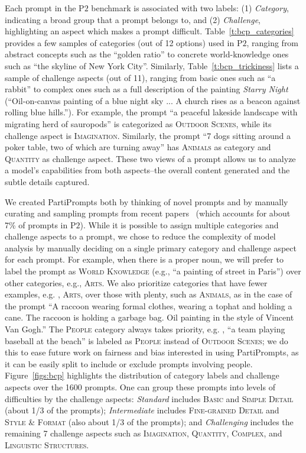 Each prompt in the P$2$ benchmark is associated with two labels: (1) {\it Category}, indicating a broad group that a prompt belongs to, and (2) {\it Challenge}, highlighting an aspect which makes a prompt difficult.
Table~\ref{t:bcp_categories} provides a few samples of categories (out of 12 options) used in P$2$, ranging from abstract concepts such as the ``golden ratio'' to concrete world-knowledge ones such as ``the skyline of New York City''. Similarly, Table~\ref{t:bcp_trickiness} lists a sample of challenge aspects (out of 11), ranging from basic ones such as ``a rabbit'' to complex ones such as a full description of the painting \textit{Starry Night} (``Oil-on-canvas painting of a blue night sky ... A church rises as a beacon against rolling blue hills.''). For example, the prompt ``a peaceful lakeside landscape with migrating herd of sauropods'' is categorized as \textsc{Outdoor Scenes}, while its challenge aspect is \textsc{Imagination}. Similarly, the prompt ``7 dogs sitting around a poker table, two of which are turning away'' has \textsc{Animals} as category and \textsc{Quantity} as challenge aspect. These two views of a prompt allows us to analyze a model's capabilities from both aspects--the overall content generated and the subtle details captured.

We created PartiPrompts both by thinking of novel prompts and by manually curating and sampling prompts from recent papers~\cite{ramesh2021zero, ding2021cogview, vqdiffusion, nichol2021glide, ramesh2022hierarchical} (which accounts for about 7\% of prompts in P$2$). While it is possible to assign multiple categories and challenge aspects to a prompt, we chose to reduce the complexity of model analysis by manually deciding on a single primary category and challenge aspect for each prompt. For example, when there is a proper noun, we will prefer to label the prompt as \textsc{World Knowledge} (e.g., ``a painting of street in Paris'') over other categories, e.g., \textsc{Arts}. We also prioritize categories that have fewer examples, e.g. , \textsc{Arts}, over those with plenty, such as \textsc{Animals}, as in the case of the prompt ``A raccoon wearing formal clothes, wearing a tophat and holding a cane. The raccoon is holding a garbage bag. Oil painting in the style of Vincent Van Gogh.'' The \textsc{People} category always takes priority, e.g. , ``a team playing baseball at the beach'' is labeled as \textsc{People} instead of \textsc{Outdoor Scenes}; we do this to ease future work on fairness and bias interested in using PartiPrompts, as it can be easily split to include or exclude prompts involving people.
Figure~\ref{figs:bcp} highlights the distribution of category labels and challenge aspects over the 1600 prompts. One can group these prompts into levels of difficulties by the challenge aspects: {\it Standard} includes \textsc{Basic} and \textsc{Simple Detail} (about 1/3 of the prompts); {\it Intermediate} includes \textsc{Fine-grained Detail} and \textsc{Style \& Format} (also about 1/3 of the prompts); and {\it Challenging} includes the remaining 7 challenge aspects such as \textsc{Imagination}, \textsc{Quantity}, \textsc{Complex}, and \textsc{Linguistic Structures}.

